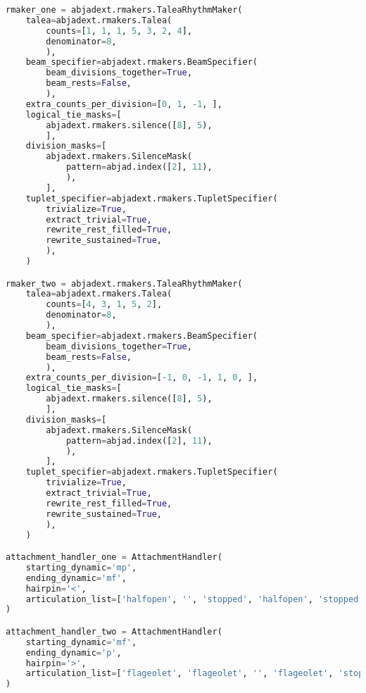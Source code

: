 \begin{lstlisting}[language=Python, caption=Invocation Source Code]
rmaker_one = abjadext.rmakers.TaleaRhythmMaker(
    talea=abjadext.rmakers.Talea(
        counts=[1, 1, 1, 5, 3, 2, 4],
        denominator=8,
        ),
    beam_specifier=abjadext.rmakers.BeamSpecifier(
        beam_divisions_together=True,
        beam_rests=False,
        ),
    extra_counts_per_division=[0, 1, -1, ],
    logical_tie_masks=[
        abjadext.rmakers.silence([8], 5),
        ],
    division_masks=[
        abjadext.rmakers.SilenceMask(
            pattern=abjad.index([2], 11),
            ),
        ],
    tuplet_specifier=abjadext.rmakers.TupletSpecifier(
        trivialize=True,
        extract_trivial=True,
        rewrite_rest_filled=True,
        rewrite_sustained=True,
        ),
    )

rmaker_two = abjadext.rmakers.TaleaRhythmMaker(
    talea=abjadext.rmakers.Talea(
        counts=[4, 3, 1, 5, 2],
        denominator=8,
        ),
    beam_specifier=abjadext.rmakers.BeamSpecifier(
        beam_divisions_together=True,
        beam_rests=False,
        ),
    extra_counts_per_division=[-1, 0, -1, 1, 0, ],
    logical_tie_masks=[
        abjadext.rmakers.silence([8], 5),
        ],
    division_masks=[
        abjadext.rmakers.SilenceMask(
            pattern=abjad.index([2], 11),
            ),
        ],
    tuplet_specifier=abjadext.rmakers.TupletSpecifier(
        trivialize=True,
        extract_trivial=True,
        rewrite_rest_filled=True,
        rewrite_sustained=True,
        ),
    )

attachment_handler_one = AttachmentHandler(
    starting_dynamic='mp',
    ending_dynamic='mf',
    hairpin='<',
    articulation_list=['halfopen', '', 'stopped', 'halfopen', 'stopped', ],
)

attachment_handler_two = AttachmentHandler(
    starting_dynamic='mf',
    ending_dynamic='p',
    hairpin='>',
    articulation_list=['flageolet', 'flageolet', '', 'flageolet', 'stopped', ],
)


\end{lstlisting}
